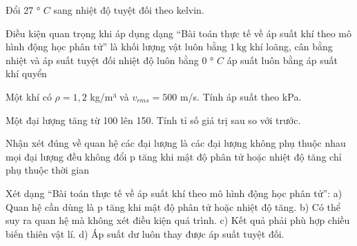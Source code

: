 \begin{ex}
Đổi 27 ° $C$ sang nhiệt độ tuyệt đối theo kelvin.
\end{ex}

\begin{ex}
Điều kiện quan trọng khi áp dụng dạng “Bài toán thực tế về áp suất khí theo mô hình động học phân tử” là
\choice
{khối lượng vật luôn bằng $1\,\text{kg}$}
{\True khí loãng, cân bằng nhiệt và áp suất tuyệt đối}
{nhiệt độ luôn bằng 0 ° $C$}
{áp suất luôn bằng áp suất khí quyển}
\end{ex}

\begin{ex}
Một khí có $\rho=1,2$ kg/m³ và $v_{rms}=500$ m/s. Tính áp suất theo kPa.
\choiceTF

\end{ex}

\begin{ex}
Một đại lượng tăng từ 100 lên 150. Tính tỉ số giá trị sau so với trước.
\end{ex}

\begin{ex}
Nhận xét đúng về quan hệ các đại lượng là
\choice
{các đại lượng không phụ thuộc nhau}
{mọi đại lượng đều không đổi}
{\True p tăng khi mật độ phân tử hoặc nhiệt độ tăng}
{chỉ phụ thuộc thời gian}
\end{ex}

\begin{ex}
Xét dạng “Bài toán thực tế về áp suất khí theo mô hình động học phân tử”: a) Quan hệ cần dùng là p tăng khi mật độ phân tử hoặc nhiệt độ tăng. b) Có thể suy ra quan hệ mà không xét điều kiện quá trình. c) Kết quả phải phù hợp chiều biến thiên vật lí. d) Áp suất dư luôn thay được áp suất tuyệt đối.
\choiceTF

\end{ex}

